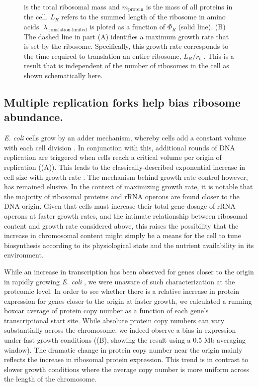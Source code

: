 \begin{figure}
\begin{fullwidth}
{{            is the total ribosomal mass and $m_{\textrm{protein}}$ is the mass
            of all proteins in the cell. $L_R$ refers to the summed length of
            the ribosome in amino acids.
            $\lambda_{\textrm{translation-limited}}$ is ploted as a function of
            $\Phi_R$ (solid line). (B) The dashed line in part (A) identifies a
            maximum growth rate that is set by the ribosome. Specifically, this
            growth rate corresponds to the time required to  translation an
            entire ribosome, $L_R/ r_t$ . This is a result that is independent
            of the number of ribosomes in the cell as shown schematically here.
            }
        \label{fig:translation_1}
        }
  \end{fullwidth}
\end{figure}


\subsection{Multiple replication forks help bias ribosome abundance.}

\textit{E. coli} cells grow by an adder mechanism, whereby cells add a constant
volume with each cell division \citep{taheriaraghi2015}. In conjunction with
this, additional rounds of DNA replication are triggered when cells reach a
critical volume per origin of replication ((A)). This
leads to the classically-described exponential increase in cell size with growth
rate \cite{schaechter1958, si2017, si2019}. The mechanism behind growth rate
control however, has remained elusive. In the context of maximizing growth rate,
it is notable that the majority of ribosomal proteins and rRNA operons are found
closer to the DNA origin. Given that cells must increase their total gene dosage
of rRNA operons at faster growth rates, and the intimate relationship between
ribosomal content and growth rate considered above, this raises the possibility
that the increase in chromosomal content might simply be a means for the cell
to tune biosynthesis according to its physiological state and the nutrient
availability in its environment.

While an increase in transcription has been observed for genes closer to the origin
in rapidly growing \textit{E. coli}  \citep{scholz2019}, we were unaware of such
characterization at the proteomic level. In order to see whether there is a
relative increase in protein expression for genes closer to the origin at faster growth, we
calculated a running boxcar average of protein copy number as a function of
each gene's transcriptional start site. While absolute protein copy numbers can vary
substantially across the chromosome, we indeed observe a bias in expression
under fast growth conditions ((B), showing the result
using a 0.5 Mb averaging window). The dramatic change in protein copy number
near the origin mainly reflects the increase in ribosomal protein expression.
This trend is in contrast to slower growth conditions where the average copy
number is more uniform across the length of the chromosome.


